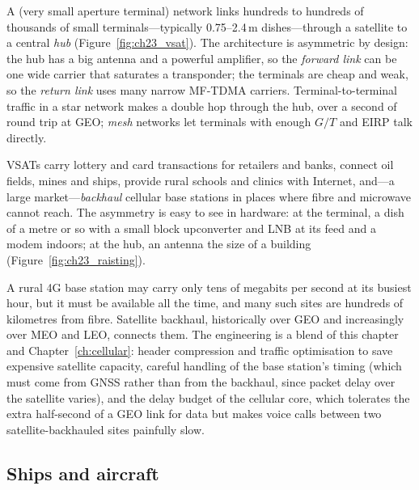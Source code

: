A  (very small aperture terminal) network links hundreds to hundreds of thousands of
small terminals---typically 0.75--2.4\,m dishes---through a satellite to a central \emph{hub}
(Figure~\ref{fig:ch23_vsat}). The architecture is asymmetric by design: the hub has a big antenna
and a powerful amplifier, so the \emph{forward link} can be one wide carrier that saturates a
transponder; the terminals are cheap and weak, so the \emph{return link} uses many narrow
MF-TDMA carriers. Terminal-to-terminal traffic in a star network makes a double hop through the
hub, over a second of round trip at GEO; \emph{mesh} networks let terminals with enough $G/T$ and
EIRP talk directly.

VSATs carry lottery and card transactions for retailers and banks, connect oil fields, mines and
ships, provide rural schools and clinics with Internet, and---a large market---\emph{backhaul}
cellular base stations in places where fibre and microwave cannot reach. The asymmetry is easy to
see in hardware: at the terminal, a dish of a metre or so with a small block upconverter and LNB
at its feed and a modem indoors; at the hub, an antenna the size of a building
(Figure~\ref{fig:ch23_raisting}).


\begin{inpractice}
A rural 4G base station may carry only tens of megabits per second at its busiest hour, but it must
be available all the time, and many such sites are hundreds of kilometres from fibre. Satellite
backhaul, historically over GEO and increasingly over MEO and LEO, connects them. The engineering
is a blend of this chapter and Chapter~\ref{ch:cellular}: header compression and traffic
optimisation to save expensive satellite capacity, careful handling of the base station's timing
(which must come from GNSS rather than from the backhaul, since packet delay over the satellite
varies), and the delay budget of the cellular core, which tolerates the extra half-second of a
GEO link for data but makes voice calls between two satellite-backhauled sites painfully slow.
\end{inpractice}

\subsection{Ships and aircraft}

